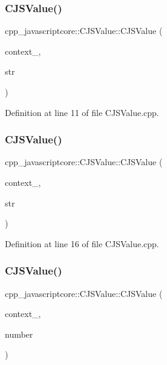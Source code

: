 \subsubsection{\texorpdfstring{C\+J\+S\+Value()}{CJSValue()}\hspace{0.1cm}{\footnotesize\ttfamily [2/7]}}
{\footnotesize\ttfamily cpp\+\_\+javascriptcore\+::\+C\+J\+S\+Value\+::\+C\+J\+S\+Value (\begin{DoxyParamCaption}\item[{J\+S\+Context\+Ref}]{context\+\_\+,  }\item[{const char $\ast$}]{str }\end{DoxyParamCaption})}



Definition at line 11 of file C\+J\+S\+Value.\+cpp.

\mbox{\label{classcpp__javascriptcore_1_1_c_j_s_value_adf9c49abc4f66e73ee2e6f642a3f6004}} 
\subsubsection{\texorpdfstring{C\+J\+S\+Value()}{CJSValue()}\hspace{0.1cm}{\footnotesize\ttfamily [3/7]}}
{\footnotesize\ttfamily cpp\+\_\+javascriptcore\+::\+C\+J\+S\+Value\+::\+C\+J\+S\+Value (\begin{DoxyParamCaption}\item[{J\+S\+Context\+Ref}]{context\+\_\+,  }\item[{const std\+::string \&}]{str }\end{DoxyParamCaption})}



Definition at line 16 of file C\+J\+S\+Value.\+cpp.

\mbox{\label{classcpp__javascriptcore_1_1_c_j_s_value_a3fc1d9f7c0fbbeb4be02f2e63bae3fc2}} 
\subsubsection{\texorpdfstring{C\+J\+S\+Value()}{CJSValue()}\hspace{0.1cm}{\footnotesize\ttfamily [4/7]}}
{\footnotesize\ttfamily cpp\+\_\+javascriptcore\+::\+C\+J\+S\+Value\+::\+C\+J\+S\+Value (\begin{DoxyParamCaption}\item[{J\+S\+Context\+Ref}]{context\+\_\+,  }\item[{double}]{number }\end{DoxyParamCaption})}



